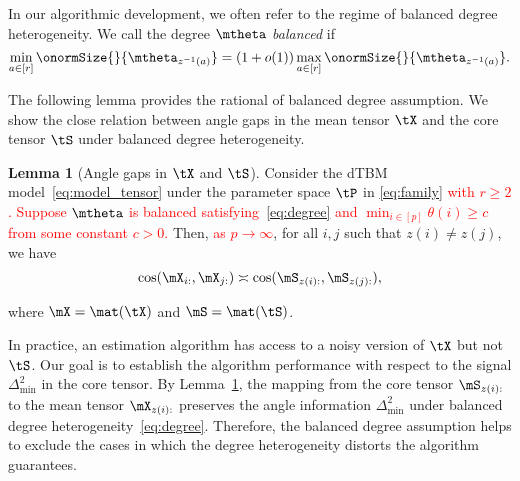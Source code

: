 \documentclass[lettersize,onecolumn,journal]{IEEEtran}
\theoremstyle{definition}
\newtheorem{lem}{Lemma}
\theoremstyle{definition}
\begin{document}
{
\color{blue}In our algorithmic development, we often refer to the regime of balanced degree heterogeneity. We call the degree $\mtheta$ \emph{balanced} if
\begin{equation}\label{eq:degree}
{\min_{a\in[r]} \onormSize{}{\mtheta_{z^{-1}(a)}}=\left(1+o(1)\right)\max_{a\in[r]}\onormSize{}{\mtheta_{z^{-1}(a)}}}.
\end{equation}

The following lemma provides the rational of balanced degree assumption. We show the close relation between angle gaps in the mean tensor $\tX$ and the core tensor $\tS$ under balanced degree heterogeneity. 


\begin{lem}[Angle gaps in $\tX$ and $\tS$]\label{lem:angle_gap_x} Consider the dTBM model~\eqref{eq:model_tensor} under the parameter space $\tP$ in \eqref{eq:family} \textcolor{red}{with $r \geq 2$. Suppose $\mtheta$ is balanced satisfying~\eqref{eq:degree} \textcolor{red}{and $\min_{i\in[p]}\theta(i)\geq c$ from some constant $c>0$}. } Then, \textcolor{red}{as $p \rightarrow \infty$}, for all $i,j$ such that $z(i) \neq z(j)$, we have
\begin{equation}
 \cos(\mX_{i:}, \mX_{j:})\asymp  \cos(\mS_{z(i):}, \mS_{z(j):}),
\end{equation}

where $\mX =\mat(\tX)$ and $\mS = \mat (\tS)$.
\end{lem}
In practice, an estimation algorithm has access to a noisy version of $\tX$ but not $\tS$. %
Our goal is to establish the algorithm performance with respect to the signal $\Delta^2_{\min}$ in the core tensor. By Lemma~\ref{lem:angle_gap_x}, the mapping from the core tensor $\mS_{z(i):}$ to the mean tensor $\mX_{z(i):}$ preserves the angle information $\Delta_{\min}^2$ under balanced degree heterogeneity~\eqref{eq:degree}. Therefore, the balanced degree assumption helps to exclude the cases in which the degree heterogeneity distorts the algorithm guarantees. 


}
\end{document}
